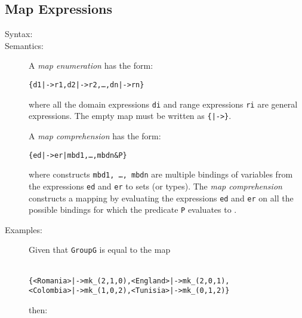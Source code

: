 \documentclass[\pformat,12pt]{article}
\begin{document}
\subsection{Map Expressions} \label{mapexpr}

\begin{description}
\item[Syntax:]

  
  

\item[Semantics:] A {\it map enumeration} has the form:
  \begin{alltt}
    \{d1 |-> r1, d2 |-> r2, \ldots, dn |-> rn\}
  \end{alltt}
  where all the domain expressions {\tt di} and range expressions {\tt ri}
  are general expressions. The empty map
  must be written as {\tt \{|->\}}.
      
  A {\it map comprehension} has the form:
  \begin{alltt}
    \{ed |-> er | mbd1, \ldots, mbdn \& P\}
  \end{alltt}
  where constructs {\tt mbd1, \ldots, mbdn} are multiple bindings of
  variables from the expressions {\tt ed} and {\tt er} to sets (or types).
  The {\it map comprehension} constructs a mapping by evaluating the
  expressions {\tt ed} and {\tt er} on all the possible bindings for which
  the predicate {\tt P} evaluates to .

\item[Examples:] Given that \texttt{GroupG} is equal to the map 
  \begin{alltt}\label{GroupGdef}
    \{ <Romania> |-> mk_(2,1,0), <England> |-> mk_(2,0,1),
      <Colombia> |-> mk_(1,0,2), <Tunisia> |-> mk_(0,1,2) \}
  \end{alltt}
  then:


\end{description}
\end{document}
